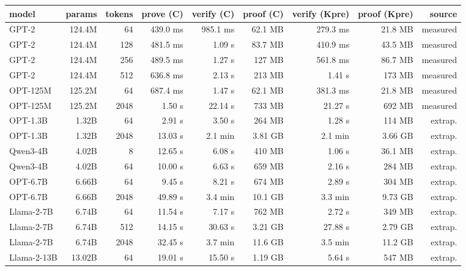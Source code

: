 \begin{tabular}{lrrrrrrrr}
\toprule
model & params & tokens & prove (C) & verify (C) & proof (C) & verify (Kpre) & proof (Kpre) & source \\
\midrule
GPT-2 & 124.4M & 64 & 439.0 ms & 985.1 ms & 62.1 MB & 279.3 ms & 21.8 MB & measured \\
GPT-2 & 124.4M & 128 & 481.5 ms & 1.09 s & 83.7 MB & 410.9 ms & 43.5 MB & measured \\
GPT-2 & 124.4M & 256 & 489.5 ms & 1.27 s & 127 MB & 561.8 ms & 86.7 MB & measured \\
GPT-2 & 124.4M & 512 & 636.8 ms & 2.13 s & 213 MB & 1.41 s & 173 MB & measured \\
OPT-125M & 125.2M & 64 & 687.4 ms & 1.47 s & 62.1 MB & 381.3 ms & 21.8 MB & measured \\
OPT-125M & 125.2M & 2048 & 1.50 s & 22.14 s & 733 MB & 21.27 s & 692 MB & measured \\
OPT-1.3B & 1.32B & 64 & 2.91 s & 3.50 s & 264 MB & 1.28 s & 114 MB & extrap. \\
OPT-1.3B & 1.32B & 2048 & 13.03 s & 2.1 min & 3.81 GB & 2.1 min & 3.66 GB & extrap. \\
Qwen3-4B & 4.02B & 8 & 12.65 s & 6.08 s & 410 MB & 1.06 s & 36.1 MB & extrap. \\
Qwen3-4B & 4.02B & 64 & 10.00 s & 6.63 s & 659 MB & 2.16 s & 284 MB & extrap. \\
OPT-6.7B & 6.66B & 64 & 9.45 s & 8.21 s & 674 MB & 2.89 s & 304 MB & extrap. \\
OPT-6.7B & 6.66B & 2048 & 49.89 s & 3.4 min & 10.1 GB & 3.3 min & 9.73 GB & extrap. \\
Llama-2-7B & 6.74B & 64 & 11.54 s & 7.17 s & 762 MB & 2.72 s & 349 MB & extrap. \\
Llama-2-7B & 6.74B & 512 & 14.15 s & 30.63 s & 3.21 GB & 27.88 s & 2.79 GB & extrap. \\
Llama-2-7B & 6.74B & 2048 & 32.45 s & 3.7 min & 11.6 GB & 3.5 min & 11.2 GB & extrap. \\
Llama-2-13B & 13.02B & 64 & 19.01 s & 15.50 s & 1.19 GB & 5.64 s & 547 MB & extrap. \\
\bottomrule
\end{tabular}

